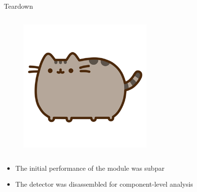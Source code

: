 \begin{columnframe}{Teardown}
    \begin{column}{0.5\textwidth}
        \begin{figure}
            \centering
            \includegraphics[width=0.6\textwidth, frame]{images/pusheen.png}
        \end{figure}
    \end{column}
    \begin{column}{0.5\textwidth}
        \begin{itemize}
            \item The initial performance of the module was subpar
            \item The detector was disassembled for component-level analysis
        \end{itemize}
    \end{column}
\end{columnframe}



